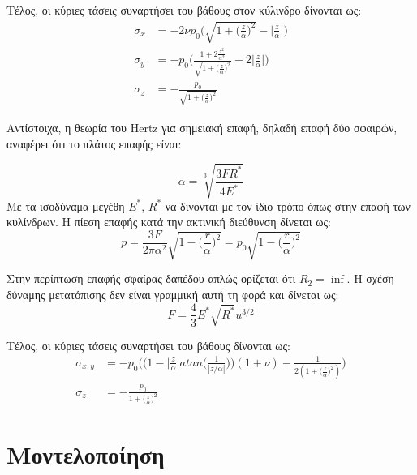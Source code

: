 \documentclass{article}
\begin{document}
Τέλος, οι κύριες τάσεις συναρτήσει του βάθους στον κύλινδρο δίνονται ως:
\begin{align}
    \sigma_x &= -2\nu p_0 \bigg(\sqrt{1 + \bigg(\frac{z}{\alpha}\bigg)^2} - \bigg|\frac{z}{\alpha}\bigg|\bigg)\\

    \sigma_y &= - p_0 \Bigg(\frac{1+2\frac{z^2}{\alpha^2}}{\sqrt{1 + \bigg(\frac{z}{\alpha}\bigg)^2}} - 2\bigg|\frac{z}{\alpha}\bigg|\Bigg)\\

    \sigma_z &= -\frac{p_0}{\sqrt{1 + \bigg(\frac{z}{\alpha}\bigg)^2}}
\end{align}



Αντίστοιχα, η θεωρία του Hertz για σημειακή επαφή, δηλαδή επαφή δύο σφαιρών,  αναφέρει ότι το πλάτος επαφής είναι:

\begin{equation}
    \alpha = \sqrt[3]{\frac{3 F R^*}{4 E^*}}
\end{equation}
Με τα ισοδύναμα μεγέθη $E^*$, $R^*$ να δίνονται με τον ίδιο τρόπο όπως στην επαφή των κυλίνδρων. Η πίεση επαφής κατά την ακτινική διεύθυνση δίνεται ως:
\begin{equation}
    p = \frac{3F}{2\pi \alpha^2} \sqrt{1 - \bigg(\frac{r}{\alpha}\bigg)^2} = p_0\sqrt{1 - \bigg(\frac{r}{\alpha}\bigg)^2}
\end{equation}

Στην περίπτωση επαφής σφαίρας δαπέδου απλώς ορίζεται ότι $R_2 = \inf$. Η σχέση δύναμης μετατόπισης δεν είναι γραμμική αυτή τη φορά και δίνεται ως:
\begin{equation}
    F = \frac{4}{3}E^* \sqrt{R^*} u^{3/2}
\end{equation}

Τέλος, οι κύριες τάσεις συναρτήσει του βάθους δίνονται ως:
\begin{align}
    \sigma_{x,y} &= - p_0 \bigg( \bigg(1-\bigg|\frac{z}{\alpha}\bigg| atan\bigg(\frac{1}{|z/\alpha|}\bigg)\bigg)(1+\nu)  - \frac{1}{2 (1 + \bigg(\frac{z}{\alpha}\bigg)^2)} \bigg)\\

    \sigma_z &= -\frac{p_0}{1 + \bigg(\frac{z}{\alpha}\bigg)^2}
\end{align}

\section{Μοντελοποίηση}
\end{document}
